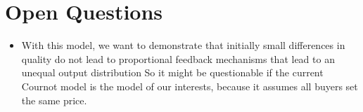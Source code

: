 \documentclass[11pt]{article}
\begin{document}
\section{Open Questions}

\begin{itemize}

    \item With this model, we want to demonstrate that initially small
        differences in quality do not lead to proportional feedback mechanisms
        that lead to an unequal output distribution So it might be questionable
        if the current Cournot model is the model of our interests, because it
        assumes all buyers set the same price. 

\end{itemize}
\end{document}
